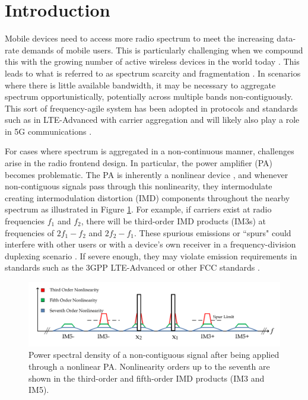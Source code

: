 \section{Introduction}
Mobile devices need to access more radio spectrum to meet the increasing data-rate demands of mobile users. 
This is particularly challenging when we compound this with the growing number of active wireless devices in the world today \cite{Cisco16}.
This leads to what is referred to as spectrum scarcity and fragmentation \cite{Staple04,Federated17}. 
In scenarios where there is little available bandwidth, it may be necessary to aggregate spectrum opportunistically, potentially across multiple bands non-contiguously. 
This sort of frequency-agile system has been adopted in protocols and standards such as in LTE-Advanced with carrier aggregation \cite{wannstrom_2013} and will likely also play a role in 5G communications \cite{Khan2014}.  

For cases where spectrum is aggregated in a non-continuous manner, challenges arise in the radio frontend design. 
In particular, the power amplifier (PA) becomes problematic. 
The PA is inherently a nonlinear device \cite{Ghannouchi09}, and whenever non-contiguous signals pass through this nonlinearity, they intermodulate creating intermodulation distortion (IMD) components throughout the nearby spectrum as illustrated in Figure \ref{fig:PSD}. 
{\color{red} For example, if carriers exist at radio frequencies $f_1$ and $f_2$, there will be third-order IMD products (IM3s) at frequencies of $2f_1 - f_2$ and $2f_2 - f_1$.}
These spurious emissions or ``spurs" could interfere with other users or with a device's own receiver in a frequency-division duplexing scenario \cite{Park13}. 
If severe enough, they may violate emission requirements in standards such as the 3GPP LTE-Advanced or other FCC standards  \cite{Commag_abdelaziz,3GPP_CA_Emissions_1,3GPP_CA_Emissions_2,LaehteensuoMay2013}. 

\begin{figure}
	\centering
	\centerline{\includegraphics[width=\columnwidth]{PSD.pdf}}
	\caption[]{Power spectral density of a non-contiguous signal after being applied through a nonlinear PA.
		Nonlinearity orders up to the seventh are shown in the third-order and fifth-order IMD products (IM3 and IM5).}
	\label{fig:PSD}
\end{figure}

